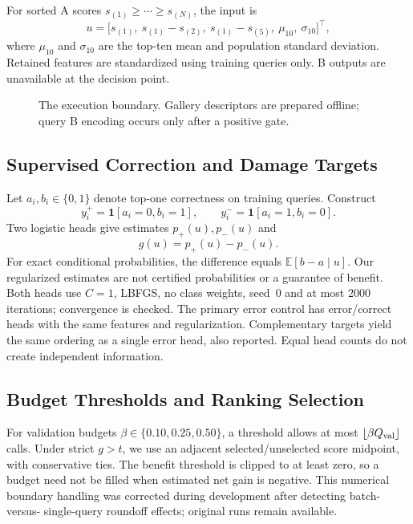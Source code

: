 \documentclass[conference]{IEEEtran}
\newcommand{\ind}{\mathbf{1}}
\begin{document}
For sorted A scores $s_{(1)}\geq\cdots\geq s_{(N)}$, the input is
\begin{equation}
u=\big[s_{(1)},\ s_{(1)}-s_{(2)},\ s_{(1)}-s_{(5)},\
\mu_{10},\ \sigma_{10}\big]^\top,
\end{equation}
where $\mu_{10}$ and $\sigma_{10}$ are the top-ten mean and population
standard deviation. Retained features are standardized using training
queries only. B outputs are unavailable at the decision point.

\begin{figure}[t]
\centering
{}
\caption{The execution boundary. Gallery descriptors are prepared offline;
query B encoding occurs only after a positive gate.}
\label{fig:pipeline}
\end{figure}

\subsection{Supervised Correction and Damage Targets}
Let $a_i,b_i\in\{0,1\}$ denote top-one correctness on training queries.
Construct
\begin{equation}
y_i^+=\ind[a_i=0,b_i=1],\qquad y_i^-=\ind[a_i=1,b_i=0].
\end{equation}
Two logistic heads give estimates $p_+(u),p_-(u)$ and
\begin{equation}
g(u)=p_+(u)-p_-(u).
\end{equation}
For exact conditional probabilities, the difference equals
$\mathbb{E}[b-a\mid u]$. Our regularized estimates are not certified
probabilities or a guarantee of benefit. Both heads use $C=1$, LBFGS,
no class weights, seed~0 and at most 2000 iterations; convergence is
checked. The primary error control has error/correct heads with the same
features and regularization. Complementary targets yield the same ordering
as a single error head, also reported. Equal head counts do not create
independent information.

\subsection{Budget Thresholds and Ranking Selection}
For validation budgets $\beta\in\{0.10,0.25,0.50\}$, a threshold allows at
most $\lfloor\beta Q_{\rm val}\rfloor$ calls. Under strict $g>t$, we use
an adjacent selected/unselected score midpoint, with conservative ties.
The benefit threshold is clipped to at least zero, so a budget need not
be filled when estimated net gain is negative. This numerical boundary
handling was corrected during development after detecting batch-versus-
single-query roundoff effects; original runs remain available.
\end{document}

